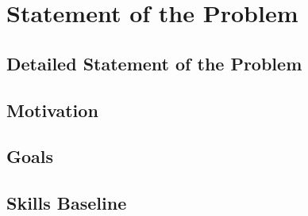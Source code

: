 \section{Statement of the Problem}
\subsection{Detailed Statement of the Problem}
\subsection{Motivation}
\subsection{Goals}
\subsection{Skills Baseline}
